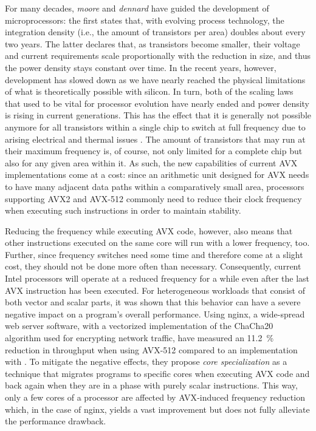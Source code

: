 {For many decades, \emph{\gls{moore}} \cite{moore1975progress} and \emph{\gls{dennard}} \cite{dennard1974design} have guided the development of microprocessors: the first states that, with evolving process technology, the integration density (i.e., the amount of transistors per area) doubles about every two years. The latter declares that, as transistors become smaller, their voltage and current requirements scale proportionally with the reduction in size, and thus the power density stays constant over time. In the recent years, however, development has slowed down as we have nearly reached the physical limitations of what is theoretically possible with silicon. In turn, both of the scaling laws that used to be vital for processor evolution have nearly ended and power density is rising in current generations. This has the effect that it is generally not possible anymore for all transistors within a single chip to switch at full frequency due to arising electrical and thermal issues \cite{taylor2012dark}. The amount of transistors that may run at their maximum frequency is, of course, not only limited for a complete chip but also for any given area within it. As such, the new capabilities of current \gls{AVX} implementations come at a cost: since an arithmetic unit designed for \gls{AVX} needs to have many adjacent data paths within a comparatively small area, processors supporting \gls{AVX2} and \gls{AVX-512} commonly need to reduce their clock frequency when executing such instructions in order to maintain stability.

Reducing the frequency while executing \gls{AVX} code, however, also means that other instructions executed on the same core will run with a lower frequency, too. Further, since frequency switches need some time and therefore come at a slight cost, they should not be done more often than necessary. Consequently, current Intel processors will operate at a reduced frequency for a while even after the last \gls{AVX} instruction has been executed. For heterogeneous workloads that consist of both vector and scalar parts, it was shown that this behavior can have a severe negative impact on a program's overall performance. Using nginx, a wide-spread web server software, with a vectorized implementation of the ChaCha20 algorithm used for encrypting network traffic, \citeauthor{gottschlag19sfma} \cite{gottschlag19sfma} have measured an \SI{11.2}{\percent} reduction in throughput when using \gls{AVX-512} compared to an implementation with . To mitigate the negative effects, they propose \emph{core specialization} as a technique that migrates programs to specific cores when executing \gls{AVX} code and back again when they are in a phase with purely scalar instructions. This way, only a few cores of a processor are affected by \gls{AVX}-induced frequency reduction which, in the case of nginx, yields a vast improvement but does not fully alleviate the performance drawback.

}
